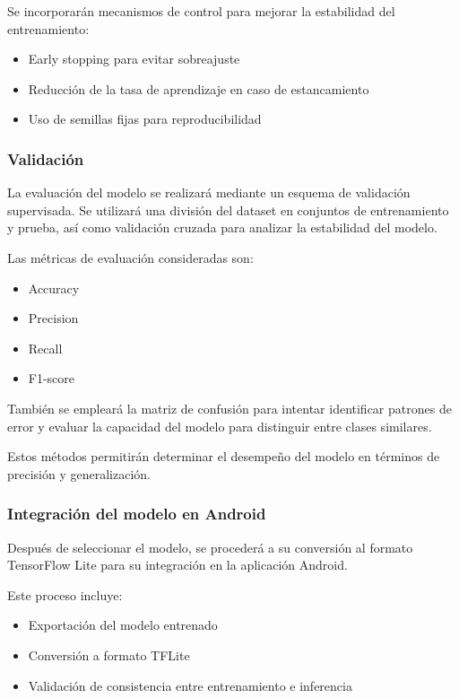 	Se incorporarán mecanismos de control para mejorar la estabilidad del entrenamiento:
	
	\begin{itemize}
		\item Early stopping para evitar sobreajuste
		\item Reducción de la tasa de aprendizaje en caso de estancamiento
		\item Uso de semillas fijas para reproducibilidad
	\end{itemize}
	\subsubsection{Validación}
	
	La evaluación del modelo se realizará mediante un esquema de validación 
	supervisada. Se utilizará una división del dataset en conjuntos de entrenamiento y prueba, así como validación cruzada para analizar la estabilidad del modelo.
	
	Las métricas de evaluación consideradas son:
	
	\begin{itemize}
		\item Accuracy
		\item Precision
		\item Recall
		\item F1-score
	\end{itemize}
	
	También se empleará la matriz de confusión para intentar identificar 
	patrones de error y evaluar la capacidad del modelo para distinguir entre clases similares.
	
	Estos métodos permitirán determinar el desempeño del modelo en términos de precisión y generalización.
	\subsubsection{Integración del modelo en Android}
	
	Después de seleccionar el modelo, se procederá a su conversión al formato TensorFlow Lite para su integración en la aplicación Android.
	
	Este proceso incluye:
	
	\begin{itemize}
		\item Exportación del modelo entrenado
		\item Conversión a formato TFLite
		\item Validación de consistencia entre entrenamiento e inferencia
	\end{itemize}
	
